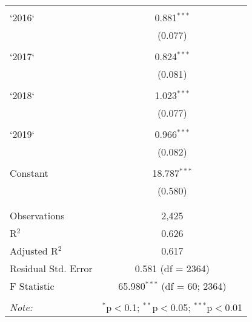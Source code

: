 \begin{table}[!htbp]
\begin{tabular}{@{\extracolsep{5pt}}lc}
  & \\ 
 `2016` & 0.881$^{***}$ \\ 
  & (0.077) \\ 
  & \\ 
 `2017` & 0.824$^{***}$ \\ 
  & (0.081) \\ 
  & \\ 
 `2018` & 1.023$^{***}$ \\ 
  & (0.077) \\ 
  & \\ 
 `2019` & 0.966$^{***}$ \\ 
  & (0.082) \\ 
  & \\ 
 Constant & 18.787$^{***}$ \\ 
  & (0.580) \\ 
  & \\ 
\hline \\[-1.8ex] 
Observations & 2,425 \\ 
R$^{2}$ & 0.626 \\ 
Adjusted R$^{2}$ & 0.617 \\ 
Residual Std. Error & 0.581 (df = 2364) \\ 
F Statistic & 65.980$^{***}$ (df = 60; 2364) \\ 
\hline 
\hline \\[-1.8ex] 
\textit{Note:}  & \multicolumn{1}{r}{$^{*}$p$<$0.1; $^{**}$p$<$0.05; $^{***}$p$<$0.01} \\ 
\end{tabular} 
\end{table} 
